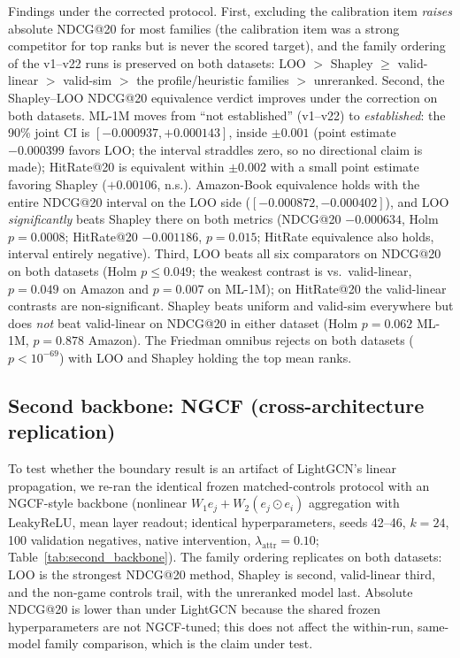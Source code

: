 \documentclass[pdflatex,sn-mathphys-num]{sn-jnl}
\begin{document}
Findings under the corrected protocol. First, excluding the calibration item \emph{raises} absolute NDCG@20 for most families (the calibration item was a strong competitor for top ranks but is never the scored target), and the family ordering of the v1--v22 runs is preserved on both datasets: LOO $>$ Shapley $\geq$ valid-linear $>$ valid-sim $>$ the profile/heuristic families $>$ unreranked. Second, the Shapley--LOO NDCG@20 equivalence verdict improves under the correction on both datasets. ML-1M moves from ``not established'' (v1--v22) to \emph{established}: the 90\% joint CI is $[-0.000937,+0.000143]$, inside $\pm0.001$ (point estimate $-0.000399$ favors LOO; the interval straddles zero, so no directional claim is made); HitRate@20 is equivalent within $\pm0.002$ with a small point estimate favoring Shapley ($+0.00106$, n.s.). Amazon-Book equivalence holds with the entire NDCG@20 interval on the LOO side ($[-0.000872,-0.000402]$), and LOO \emph{significantly} beats Shapley there on both metrics (NDCG@20 $-0.000634$, Holm $p=0.0008$; HitRate@20 $-0.001186$, $p=0.015$; HitRate equivalence also holds, interval entirely negative). Third, LOO beats all six comparators on NDCG@20 on both datasets (Holm $p\le0.049$; the weakest contrast is vs.\ valid-linear, $p=0.049$ on Amazon and $p=0.007$ on ML-1M); on HitRate@20 the valid-linear contrasts are non-significant. Shapley beats uniform and valid-sim everywhere but does \emph{not} beat valid-linear on NDCG@20 in either dataset (Holm $p=0.062$ ML-1M, $p=0.878$ Amazon). The Friedman omnibus rejects on both datasets ($p<10^{-69}$) with LOO and Shapley holding the top mean ranks.

\subsection{Second backbone: NGCF (cross-architecture replication)}\label{subsec:second_backbone}

To test whether the boundary result is an artifact of LightGCN's linear propagation, we re-ran the identical frozen matched-controls protocol with an NGCF-style backbone (nonlinear $W_1e_j+W_2(e_j\odot e_i)$ aggregation with LeakyReLU, mean layer readout; identical hyperparameters, seeds 42--46, $k=24$, 100 validation negatives, native intervention, $\lambda_{\text{attr}}=0.10$; Table~\ref{tab:second_backbone}). The family ordering replicates on both datasets: LOO is the strongest NDCG@20 method, Shapley is second, valid-linear third, and the non-game controls trail, with the unreranked model last. Absolute NDCG@20 is lower than under LightGCN because the shared frozen hyperparameters are not NGCF-tuned; this does not affect the within-run, same-model family comparison, which is the claim under test.
\end{document}

